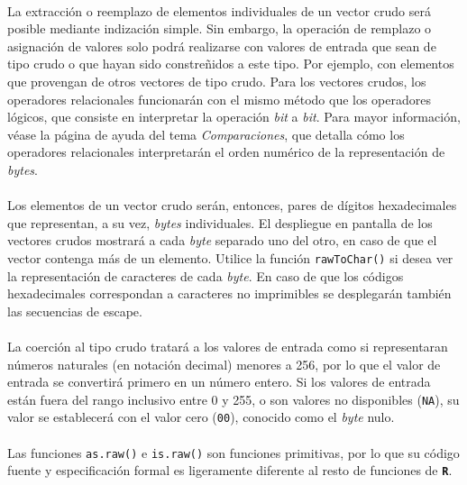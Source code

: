 \documentclass{article}[letter, 12pt]
\def\code#1{\texttt{#1}}
\def\codename#1{\textbf{\texttt{\color{gray}#1}}}
\begin{document}
\paragraph{}La extracción o reemplazo de elementos individuales de un vector crudo será posible mediante indización simple. Sin embargo, la operación de remplazo o asignación de valores solo podrá realizarse con valores de entrada que sean de tipo crudo o que hayan sido constreñidos a este tipo. Por ejemplo, con elementos que provengan de otros vectores de tipo crudo. Para los vectores crudos, los operadores relacionales funcionarán con el mismo método que los operadores lógicos, que consiste en interpretar la operación \textit{bit} a \textit{bit}. Para mayor información, véase la página de ayuda del tema \textit{Comparaciones}, que detalla cómo los operadores relacionales interpretarán el orden numérico de la representación de \textit{bytes}.\par

\paragraph{}Los elementos de un vector crudo serán, entonces, pares de dígitos hexadecimales que representan, a su vez, \textit{bytes} individuales. El despliegue en pantalla de los vectores crudos mostrará a cada \textit{byte} separado uno del otro, en caso de que el vector contenga más de un elemento. Utilice la función \code{rawToChar()} si desea ver la representación de caracteres de cada \textit{byte}. En caso de que los códigos hexadecimales correspondan a caracteres no imprimibles se desplegarán también las secuencias de escape.\par

\paragraph{}La coerción al tipo crudo tratará a los valores de entrada como si representaran números naturales (en notación decimal) menores a 256, por lo que el valor de entrada se convertirá primero en un número entero. Si los valores de entrada están fuera del rango inclusivo entre 0 y 255, o son valores no disponibles (\code{NA}), su valor se establecerá con el valor cero (\code{00}), conocido como el \textit{byte} nulo.\par

\paragraph{}Las funciones \code{as.raw()} e \code{is.raw()} son funciones primitivas, por lo que su código fuente y especificación formal es ligeramente diferente al resto de funciones de \codename{R}.\par
\end{document}
